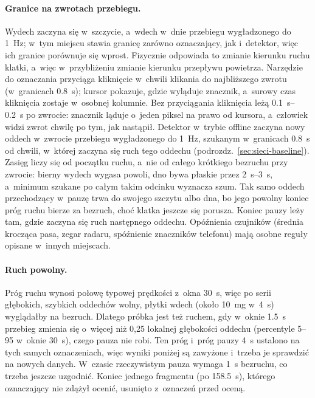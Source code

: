 \documentclass[12pt,a4paper,oneside]{report}
\begin{document}
\paragraph{Granice na zwrotach przebiegu.} Wydech zaczyna się w~szczycie, a~wdech w~dnie przebiegu
wygładzonego do \SI{1}{Hz}; w~tym miejscu stawia granicę zarówno oznaczający, jak i~detektor, więc ich
granice porównuje się wprost. Fizycznie odpowiada to zmianie kierunku ruchu klatki, a~więc
w~przybliżeniu zmianie kierunku przepływu powietrza. Narzędzie do oznaczania przyciąga kliknięcie
w~chwili klikania do najbliższego zwrotu (w~granicach \SI{0.8}{s}); kursor pokazuje, gdzie wyląduje
znacznik, a~surowy czas kliknięcia zostaje w~osobnej kolumnie. Bez przyciągania kliknięcia leżą
\SIrange{0.1}{0.2}{s} po zwrocie: znacznik ląduje o~jeden piksel na prawo od kursora, a~człowiek widzi
zwrot chwilę po tym, jak nastąpił. Detektor w~trybie offline zaczyna nowy oddech w~zwrocie przebiegu
wygładzonego do \SI{1}{Hz}, szukanym w~granicach \SI{0.8}{s} od chwili, w~której zaczyna się ruch tego
oddechu (podrozdz.~\ref{sec:sieci-baseline}). Zasięg liczy się od początku ruchu, a~nie od całego
krótkiego bezruchu przy zwrocie: bierny wydech wygasa powoli, dno bywa płaskie przez \SIrange{2}{3}{s},
a~minimum szukane po całym takim odcinku wyznacza szum. Tak samo oddech przechodzący w~pauzę trwa do
swojego szczytu albo dna, bo jego powolny koniec próg ruchu bierze za bezruch, choć klatka jeszcze się
porusza. Koniec pauzy leży tam, gdzie zaczyna się ruch następnego oddechu. Opóźnienia czujników (średnia
krocząca pasa, zegar radaru, spóźnienie znaczników telefonu) mają osobne reguły opisane w~innych miejscach.

\paragraph{Ruch powolny.} Próg ruchu wynosi połowę typowej prędkości z~okna \SI{30}{s}, więc po serii
głębokich, szybkich oddechów wolny, płytki wdech (około \SI{10}{mg} w~\SI{4}{s}) wyglądałby na bezruch.
Dlatego próbka jest też ruchem, gdy w~oknie \SI{1.5}{s} przebieg zmienia się o~więcej niż 0,25 lokalnej
głębokości oddechu (percentyle 5--95 w~oknie \SI{30}{s}), czego pauza nie robi. Ten próg i~próg pauzy
\SI{4}{s} ustalono na tych samych oznaczeniach, więc wyniki poniżej są zawyżone i~trzeba je sprawdzić na
nowych danych. W~czasie rzeczywistym pauza wymaga \SI{1}{s} bezruchu, co trzeba jeszcze uzgodnić.
Koniec jednego fragmentu (po \SI{158.5}{s}), którego oznaczający nie zdążył ocenić, usunięto
z~oznaczeń przed oceną.
\end{document}

